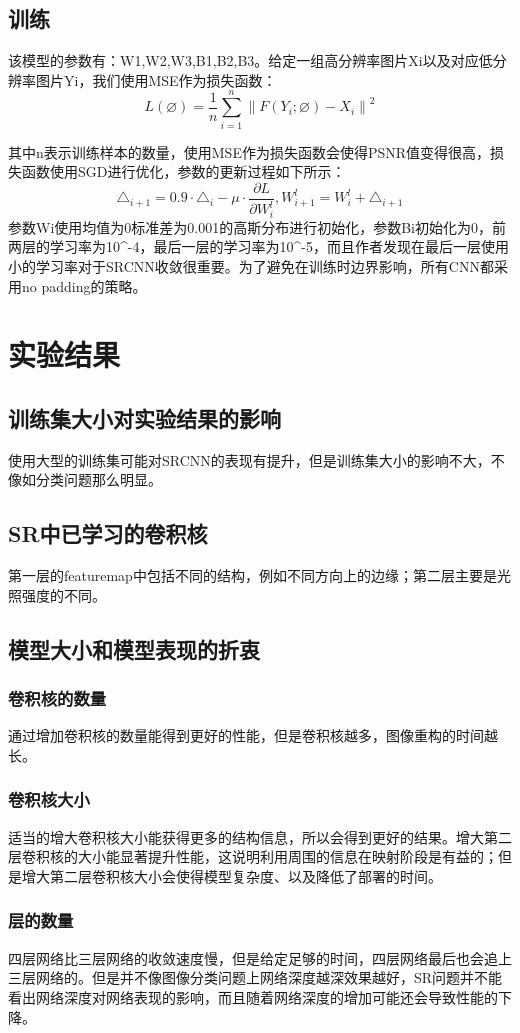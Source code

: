 \documentclass[UTF8,a4paper,10pt]{ctexrep}
\begin{document}
\subsection{训练}

该模型的参数有：W1,W2,W3,B1,B2,B3。给定一组高分辨率图片Xi以及对应低分辨率图片Yi，我们使用MSE作为损失函数：
$$L(\varnothing)=\frac1n\sum_{i=1}^n\left\|F(Y_i;\varnothing)-X_i\right\|^2$$

其中n表示训练样本的数量，使用MSE作为损失函数会使得PSNR值变得很高，损失函数使用SGD进行优化，参数的更新过程如下所示：
$$\triangle_{i+1}=0.9\cdot\triangle_i-\mu\cdot\frac{\partial L}{\partial W_i^l},W_{i+1}^l=W_i^l+\triangle_{i+1}$$
参数Wi使用均值为0标准差为0.001的高斯分布进行初始化，参数Bi初始化为0，前两层的学习率为10\^{}-4，最后一层的学习率为10\^{}-5，而且作者发现在最后一层使用小的学习率对于SRCNN收敛很重要。为了避免在训练时边界影响，所有CNN都采用no padding的策略。


\section{实验结果}
\subsection{训练集大小对实验结果的影响}
使用大型的训练集可能对SRCNN的表现有提升，但是训练集大小的影响不大，不像如分类问题那么明显。
\subsection{SR中已学习的卷积核}
第一层的featuremap中包括不同的结构，例如不同方向上的边缘；第二层主要是光照强度的不同。
\subsection{模型大小和模型表现的折衷}
\subsubsection{卷积核的数量}
通过增加卷积核的数量能得到更好的性能，但是卷积核越多，图像重构的时间越长。
\subsubsection{卷积核大小}
适当的增大卷积核大小能获得更多的结构信息，所以会得到更好的结果。增大第二层卷积核的大小能显著提升性能，这说明利用周围的信息在映射阶段是有益的；但是增大第二层卷积核大小会使得模型复杂度、以及降低了部署的时间。
\subsubsection{层的数量}
四层网络比三层网络的收敛速度慢，但是给定足够的时间，四层网络最后也会追上三层网络的。但是并不像图像分类问题上网络深度越深效果越好，SR问题并不能看出网络深度对网络表现的影响，而且随着网络深度的增加可能还会导致性能的下降。
\end{document}
